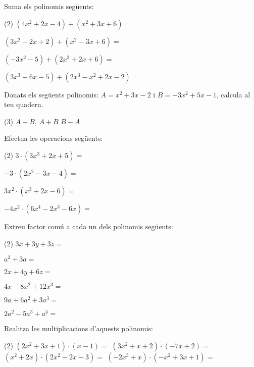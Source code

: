 \begin{mylist}
\exer Suma els polinomis següents:
\begin{tasks}(2)
	\task  $\left(4x^{2} +2x-4\right)+\left(x^{2} +3x+6\right)=$  
	                
	\task  $\left(3x^{2} -2x+2\right)+\left(x^{2} -3x+6\right)=$  
	                                                         
	\task  $\left(-3x^{2} -5\right)+\left(2x^{2} +2x+6\right)=$   
	        
	\task $\left(3x^{3} +6x-5\right)+\left(2x^{3} -x^{2} +2x-2\right)=$             
\end{tasks}

\exer  Donats els següents polinomis:  $A=x^{2} +3x-2$ i $B=-3x^{2} +5x-1$, calcula al teu  quadern.
\begin{tasks}(3)
	\task  $A-B$,   
	\task  $A+B$   
	\task $B-A$
\end{tasks}

\exer  Efectua les operacions següents:
\begin{tasks}(2)
	\task   $3\cdot \left(3x^{3} +2x+5\right)=$        
	                                
	\task   $-3\cdot \left(2x^{2} -3x-4\right)=$
	
	\task   $3x^{2} \cdot \left(x^{3} +2x-6\right)=$
	
	\task   $-4x^{2} \cdot \left(6x^{4} -2x^{3} -6x\right)=$
\end{tasks}

\exer  Extreu factor comú a cada un dels polinomis següents: 
\begin{tasks}(2)
	\task  $3x+3y+3z=$
	
	\task  $a^{2} +3a=$
	
	\task  $2x+4y+6z=$
	
	\task  $4x-8x^{2} +12x^{3} =$
	
	\task  $9a^{} +6a^{2} +3a^{3} =$
	
	\task  $2a^{2} -5a^{3} +a^{4} =$
\end{tasks}

\exer  Realitza les multiplicacions d'aquests polinomis:                               
\begin{tasks}(2)
	\task  $\left(2x^{2} +3x+1\right)\cdot \left(x-1\right)=$   
	\task $\left(3x^{2} +x+2\right)\cdot \left(-7x+2\right)=$                                 
	\task  $\left(x^{2} +2x\right)\cdot \left(2x^{2} -2x-3\right)=$     
	\task $\left(-2x^{3} +x\right)\cdot \left(-x^{2} +3x+1\right)=$    
	   

\end{tasks}
\end{mylist}
